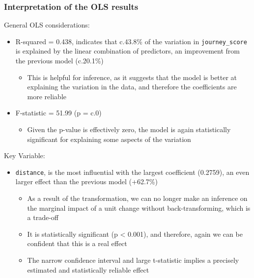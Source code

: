 \documentclass[
  number]{elsarticle}
\providecommand{\tightlist}{%
  \setlength{\itemsep}{0pt}\setlength{\parskip}{0pt}}
\begin{document}
\subsubsection{Interpretation of the OLS
results}\label{sec-interpretation-ols-2}

General OLS considerations:

\begin{itemize}
\tightlist
\item
  R-squared = 0.438, indicates that c.43.8\% of the variation in
  \texttt{\textquotesingle{}journey\_score\textquotesingle{}} is
  explained by the linear combination of predictors, an improvement from
  the previous model (c.20.1\%)

  \begin{itemize}
  \tightlist
  \item
    This is helpful for inference, as it suggests that the model is
    better at explaining the variation in the data, and therefore the
    coefficients are more reliable
  \end{itemize}
\item
  F-statistic = 51.99 (p = c.0)

  \begin{itemize}
  \tightlist
  \item
    Given the p-value is effectively zero, the model is again
    statistically significant for explaining some aspects of the
    variation
  \end{itemize}
\end{itemize}

Key Variable:

\begin{itemize}
\tightlist
\item
  \texttt{\textquotesingle{}distance\textquotesingle{}}, is the most
  influential with the largest coefficient (0.2759), an even larger
  effect than the previous model (+62.7\%)

  \begin{itemize}
  \tightlist
  \item
    As a result of the transformation, we can no longer make an
    inference on the marginal impact of a unit change without
    back-transforming, which is a trade-off
  \item
    It is statistically significant (p \textless{} 0.001), and
    therefore, again we can be confident that this is a real effect
  \item
    The narrow confidence interval and large t-statistic implies a
    precisely estimated and statistically reliable effect
  \end{itemize}
\end{itemize}
\end{document}
